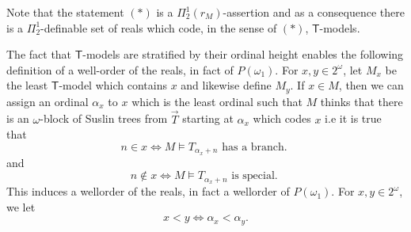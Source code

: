 \documentclass[a4paper,12pt]{article}
\newcommand{\T}{\mathsf{T}}
\begin{document}
Note that the statement $(\ast)$ is a $\Pi^1_2(r_{M})$-assertion and
as a consequence there is a $\Pi^1_2$-definable set of reals which code, in the sense of $(\ast)$, $\T$-models.

The fact that $\T$-models are stratified by their ordinal height enables the
following definition of a well-order of the reals, in fact of $P(\omega_1)$.
For $x,y \in 2^{\omega}$, let $M_x$ be the least $\T$-model which contains $x$ and likewise define $M_y$. 
If $x \in M$, then we can assign an ordinal $\alpha_x$ to $x$ which is the least ordinal such that $M$ thinks that there is an $\omega$-block of Suslin trees from $\vec{T}$ starting at $\alpha_x$ which codes $x$ i.e it is true that 
\[ n \in x \Leftrightarrow M \models T_{\alpha_x+n} \text{ has a branch. }\]
and
\[n \notin x \Leftrightarrow M \models T_{\alpha_x +n} \text{ is special. }\]
This induces a wellorder of the reals, in fact a wellorder of $P(\omega_1)$. For $x,y \in 2^{\omega}$, we let
\[x < y \Leftrightarrow \alpha_x < \alpha_y.\]
\end{document}
